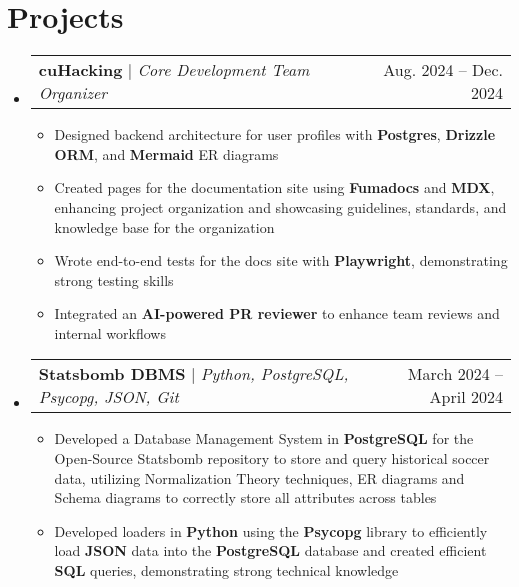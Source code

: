 \documentclass[letterpaper,11pt]{article}
\makeatletter
\newcommand{\resumeItem}[1]{
  \item\small{
    {#1 \vspace{-2pt}}
  }
}
\newcommand{\resumeProjectHeading}[2]{
    \item
    \begin{tabular*}{0.97\textwidth}{l@{\extracolsep{\fill}}r}
      \small#1 & #2 \\
    \end{tabular*}\vspace{-7pt}
}
\newcommand{\resumeSubHeadingListStart}{\begin{itemize}[leftmargin=0.15in, label={}]}
\newcommand{\resumeSubHeadingListEnd}{\end{itemize}}
\newcommand{\resumeItemListStart}{\begin{itemize}}
\newcommand{\resumeItemListEnd}{\end{itemize}\vspace{-5pt}}
\makeatother
\begin{document}
\section{Projects}
    \resumeSubHeadingListStart
      \resumeProjectHeading
      {\textbf{cuHacking} $|$ \emph{Core Development Team Organizer}}{Aug.  2024 -- Dec. 2024}
          \resumeItemListStart
           \resumeItem{Designed backend architecture for user profiles with \textbf{Postgres}, \textbf{Drizzle ORM}, and \textbf{Mermaid} ER diagrams}
          
          \resumeItem{Created pages for the documentation site using \textbf{Fumadocs} and \textbf{MDX}, enhancing project organization and showcasing guidelines, standards, and knowledge base for the organization}
          
          \resumeItem{Wrote end-to-end tests for the docs site with \textbf{Playwright}, demonstrating strong testing skills}
          
          \resumeItem{Integrated an \textbf{AI-powered PR reviewer} to enhance team reviews and internal workflows}
          \resumeItemListEnd
      \resumeProjectHeading
          {\textbf{Statsbomb DBMS} $|$ \emph{Python, PostgreSQL, Psycopg, JSON, Git}}{March 2024 -- April 2024}
          \resumeItemListStart
            \resumeItem{Developed a Database Management System in \textbf{PostgreSQL} for the Open-Source Statsbomb repository to store and query historical soccer data, utilizing Normalization Theory techniques, ER diagrams and Schema diagrams to correctly store all attributes across tables}
            \resumeItem{Developed loaders in \textbf{Python} using the \textbf{Psycopg} library to efficiently load \textbf{JSON} data into the \textbf{PostgreSQL} database and created efficient \textbf{SQL} queries, demonstrating strong technical knowledge}
          \resumeItemListEnd
    \resumeSubHeadingListEnd


\end{document}
